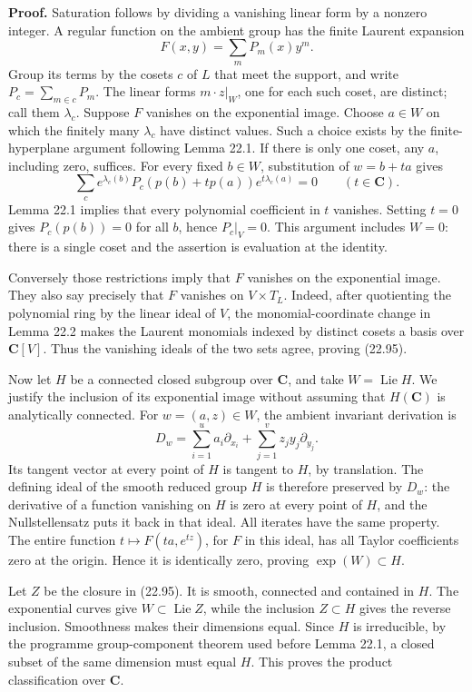 \documentclass[
  11pt,
  a4paper,
]{article}
\begin{document}
\textbf{Proof.} Saturation follows by dividing a vanishing linear form
by a nonzero integer. A regular function on the ambient group has the
finite Laurent expansion \[
 F(x,y)=\sum_m P_m(x)y^m.
\] Group its terms by the cosets \(c\) of \(L\) that meet the support,
and write \(P_c=\sum_{m\in c}P_m\). The linear forms \(m\cdot z|_W\),
one for each such coset, are distinct; call them \(\lambda_c\). Suppose
\(F\) vanishes on the exponential image. Choose \(a\in W\) on which the
finitely many \(\lambda_c\) have distinct values. Such a choice exists
by the finite-hyperplane argument following Lemma 22.1. If there is only
one coset, any \(a\), including zero, suffices. For every fixed
\(b\in W\), substitution of \(w=b+ta\) gives \[
 \sum_c e^{\lambda_c(b)}P_c(p(b)+t p(a))e^{t\lambda_c(a)}=0
       \qquad(t\in\mathbf C).
\] Lemma 22.1 implies that every polynomial coefficient in \(t\)
vanishes. Setting \(t=0\) gives \(P_c(p(b))=0\) for all \(b\), hence
\(P_c|_V=0\). This argument includes \(W=0\): there is a single coset
and the assertion is evaluation at the identity.

Conversely those restrictions imply that \(F\) vanishes on the
exponential image. They also say precisely that \(F\) vanishes on
\(V\times T_L\). Indeed, after quotienting the polynomial ring by the
linear ideal of \(V\), the monomial-coordinate change in Lemma 22.2
makes the Laurent monomials indexed by distinct cosets a basis over
\(\mathbf C[V]\). Thus the vanishing ideals of the two sets agree,
proving (22.95).

Now let \(H\) be a connected closed subgroup over \(\mathbf C\), and
take \(W=\operatorname{Lie}H\). We justify the inclusion of its
exponential image without assuming that \(H(\mathbf C)\) is analytically
connected. For \(w=(a,z)\in W\), the ambient invariant derivation is \[
 D_w=\sum_{i=1}^u a_i\partial_{x_i}
           +\sum_{j=1}^v z_jy_j\partial_{y_j}.
\] Its tangent vector at every point of \(H\) is tangent to \(H\), by
translation. The defining ideal of the smooth reduced group \(H\) is
therefore preserved by \(D_w\): the derivative of a function vanishing
on \(H\) is zero at every point of \(H\), and the Nullstellensatz puts
it back in that ideal. All iterates have the same property. The entire
function \(t\mapsto F(ta,e^{tz})\), for \(F\) in this ideal, has all
Taylor coefficients zero at the origin. Hence it is identically zero,
proving \(\exp(W)\subset H\).

Let \(Z\) be the closure in (22.95). It is smooth, connected and
contained in \(H\). The exponential curves give
\(W\subset\operatorname{Lie}Z\), while the inclusion \(Z\subset H\)
gives the reverse inclusion. Smoothness makes their dimensions equal.
Since \(H\) is irreducible, by the programme group-component theorem
used before Lemma 22.1, a closed subset of the same dimension must equal
\(H\). This proves the product classification over \(\mathbf C\).
\end{document}

